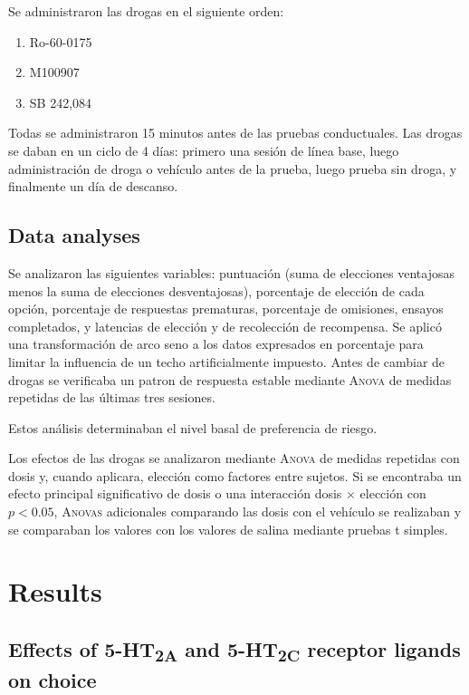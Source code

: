 \documentclass[a4paper,12pt]{article}
\begin{document}
Se administraron las drogas en el siguiente orden:
\begin{enumerate}
    \item Ro-60-0175
    \item M100907
    \item SB 242,084
\end{enumerate}
Todas se administraron 15 minutos antes de las pruebas conductuales. Las drogas se daban en un ciclo de 4 días: primero una sesión de línea base, luego administración de droga o vehículo antes de la prueba, luego prueba sin droga, y finalmente un día de descanso.

\subsection{Data analyses}

Se analizaron las siguientes variables: puntuación (suma de elecciones ventajosas menos la suma de elecciones desventajosas), porcentaje de elección de cada opción, porcentaje de respuestas prematuras, porcentaje de omisiones, ensayos completados, y latencias de elección y de recolección de recompensa. Se aplicó una transformación de arco seno a los datos expresados en porcentaje para limitar la influencia de un techo artificialmente impuesto. Antes de cambiar de drogas se verificaba un patron de respuesta estable mediante {\scshape Anova} de medidas repetidas de las últimas tres sesiones.

Estos análisis determinaban el nivel basal de preferencia de riesgo.

Los efectos de las drogas se analizaron mediante {\scshape Anova} de medidas repetidas con dosis y, cuando aplicara, elección como factores entre sujetos. Si se encontraba un efecto principal significativo de dosis o una interacción dosis $\times$ elección con $p < 0.05$, {\scshape Anovas} adicionales comparando las dosis con el vehículo se realizaban y se comparaban los valores con los valores de salina mediante pruebas t simples.

\section{Results}

\subsection{Effects of 5-HT\textsubscript{2A} and 5-HT\textsubscript{2C} receptor ligands on choice}
\end{document}
